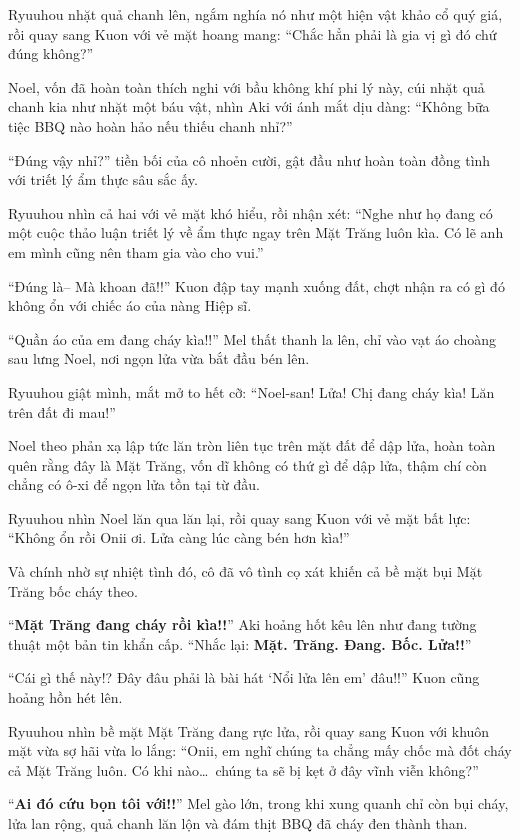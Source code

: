 \documentclass[../main.tex]{subfiles}
\begin{document}
Ryuuhou nhặt quả chanh lên, ngắm nghía nó như một hiện vật khảo cổ quý giá, rồi quay sang Kuon với vẻ mặt hoang mang: ``Chắc hẳn phải là gia vị gì đó chứ đúng không?''

Noel, vốn đã hoàn toàn thích nghi với bầu không khí phi lý này, cúi nhặt quả chanh kia như nhặt một báu vật, nhìn Aki với ánh mắt dịu dàng: ``Không bữa tiệc BBQ nào hoàn hảo nếu thiếu chanh nhỉ?''

``Đúng vậy nhỉ?'' tiền bối của cô nhoẻn cười, gật đầu như hoàn toàn đồng tình với triết lý ẩm thực sâu sắc ấy.

Ryuuhou nhìn cả hai với vẻ mặt khó hiểu, rồi nhận xét: ``Nghe như họ đang có một cuộc thảo luận triết lý về ẩm thực ngay trên Mặt Trăng luôn kìa. Có lẽ anh em mình cũng nên tham gia vào cho vui.''

``Đúng là-- Mà khoan đã!!'' Kuon đập tay mạnh xuống đất, chợt nhận ra có gì đó không ổn với chiếc áo của nàng Hiệp sĩ.

``Quần áo của em đang cháy kìa!!'' Mel thất thanh la lên, chỉ vào vạt áo choàng sau lưng Noel, nơi ngọn lửa vừa bắt đầu bén lên.

Ryuuhou giật mình, mắt mở to hết cỡ: ``Noel-san! Lửa! Chị đang cháy kìa! Lăn trên đất đi mau!''

Noel theo phản xạ lập tức lăn tròn liên tục trên mặt đất để dập lửa, hoàn toàn quên rằng đây là Mặt Trăng, vốn dĩ không có thứ gì để dập lửa, thậm chí còn chẳng có ô-xi để ngọn lửa tồn tại từ đầu.

Ryuuhou nhìn Noel lăn qua lăn lại, rồi quay sang Kuon với vẻ mặt bất lực: ``Không ổn rồi Onii ơi. Lửa càng lúc càng bén hơn kìa!''

Và chính nhờ sự nhiệt tình đó, cô đã vô tình cọ xát khiến cả bề mặt bụi Mặt Trăng bốc cháy theo.

``\textbf{Mặt Trăng đang cháy rồi kìa!!}'' Aki hoảng hốt kêu lên như đang tường thuật một bản tin khẩn cấp. ``Nhắc lại: \textbf{Mặt. Trăng. Đang. Bốc. Lửa!!}''

``Cái gì thế này!? Đây đâu phải là bài hát `Nổi lửa lên em' đâu!!'' Kuon cũng hoảng hồn hét lên.

Ryuuhou nhìn bề mặt Mặt Trăng đang rực lửa, rồi quay sang Kuon với khuôn mặt vừa sợ hãi vừa lo lắng: ``Onii, em nghĩ chúng ta chẳng mấy chốc mà đốt cháy cả Mặt Trăng luôn. Có khi nào\dots\ chúng ta sẽ bị kẹt ở đây vĩnh viễn không?''

``\textbf{Ai đó cứu bọn tôi với!!}'' Mel gào lớn, trong khi xung quanh chỉ còn bụi cháy, lửa lan rộng, quả chanh lăn lộn và đám thịt BBQ đã cháy đen thành than.
\end{document}
